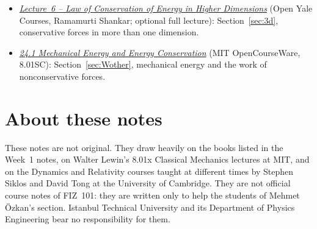 \documentclass[11pt,a4paper]{article}
\begin{document}
\begin{itemize}[nosep]
\item \href{https://oyc.yale.edu/physics/phys-200/lecture-6}{\emph{Lecture~6 -- Law of Conservation of
  Energy in Higher Dimensions}} (Open Yale Courses, Ramamurti Shankar; optional full lecture):
  Section~\ref{sec:3d}, conservative forces in more than one dimension.
\item \href{https://ocw.mit.edu/courses/8-01sc-classical-mechanics-fall-2016/pages/week-8-potential-energy-and-energy-conservation/24-1-mechanical-energy-and-energy-conservation/}{\emph{24.1
  Mechanical Energy and Energy Conservation}} (MIT OpenCourseWare, 8.01SC):
  Section~\ref{sec:Wother}, mechanical energy and the work of nonconservative forces.
\end{itemize}

\section*{About these notes}
These notes are not original. They draw heavily on the books listed in the Week~1 notes, on Walter Lewin's 8.01x Classical Mechanics lectures at MIT, and on the Dynamics and Relativity courses taught at different times by Stephen Siklos and David Tong at the University of Cambridge. They are not official course notes of FIZ~101: they are written only to help the students of Mehmet \"Ozkan's section. Istanbul Technical University and its Department of Physics Engineering bear no responsibility for them.
\end{document}
